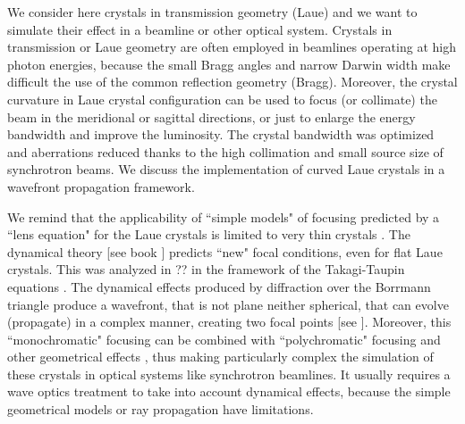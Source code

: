 \documentclass[preprint]{iucr}              %
\newcommand{\inred}[1]{{\color{red}#1}}
\begin{document}
We consider here crystals in transmission geometry (Laue) and we want to simulate their effect in a beamline or other optical system. 
Crystals in transmission or Laue geometry are often employed in beamlines operating at high photon energies, because the small Bragg angles and narrow Darwin width make difficult the use of the common reflection geometry (Bragg).
Moreover, the crystal curvature in Laue crystal configuration can be used to focus (or collimate) the beam in the meridional \cite{Suortti1988,SuorttiShulze} or sagittal \cite{Zhong2001} directions, or just to enlarge the energy bandwidth and improve the luminosity. 
The crystal bandwidth was optimized and aberrations reduced thanks to the high collimation and small source size of synchrotron beams. 
We discuss the implementation of curved Laue crystals in a wavefront propagation framework. 

We remind that the applicability of ``simple models" of focusing predicted by a ``lens equation" for the Laue crystals is limited to very thin crystals \cite{guigaySanchezdelrio2022}.
The dynamical theory [see book \cite{authierbook}] predicts ``new" focal conditions, even for flat Laue crystals.
This was analyzed in \cite{Kohn2000} \inred{??} in the framework of the Takagi-Taupin equations \cite{Takagi1962, Takagi, Taupin, Taupin1967}. The dynamical effects produced by diffraction over the Borrmann triangle produce a wavefront, that is not plane neither spherical, that can evolve (propagate) in a complex manner, creating two focal points [see \cite{Nesterets2008, GuigayFerrero2013, GuigayFerrero2016}].
Moreover, this ``monochromatic" focusing can be combined with ``polychromatic" focusing and other geometrical effects \cite{PengQi, PengQi2021}, thus making particularly complex the simulation of these crystals in optical systems like synchrotron beamlines. It usually requires a wave optics treatment to take into account dynamical effects, because the simple geometrical models or ray propagation have limitations.  
\end{document}
